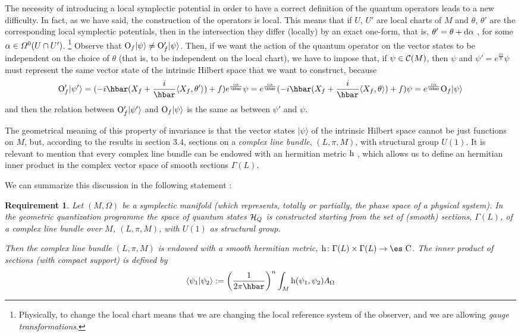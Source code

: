 \documentclass[12pt]{article}
\theoremstyle{plain}
\newtheorem{require}{Requirement}
\def\beq{\begin{equation}}
\def\eeq{\end{equation}}
\def\d{{\rm d}}
\def\C{{\cal C}}
\def\H{{\cal H}}
\def\sta{|\psi \rangle }
\def\Op{{\rm O}}
\def\h{{\rm h}}
\def\Complex{\mbox{\es C}}
\def\LF{{\mit\Lambda}_{\Omega}}
\begin{document}
The necessity of introducing a local symplectic potential
in order to have a correct definition of the
quantum operators leads to a new difficulty.
In fact, as we have said,
the construction of the operators is local.
This means that if
$U$, $U'$ are local charts of $M$
and $\theta$, $\theta '$
are the corresponding local symplectic potentials,
then in the intersection
they differ (locally) by an exact one-form,
that is,
$\theta' = \theta + \d \alpha$ ,
for some
$\alpha \in {\mit\Omega}^0(U \cap U')$.%
\footnote
{Physically, to change the local chart means that we are changing
the local reference system of the observer,
and we are allowing {\it gauge transformations}.
}
Observe that $\Op_f\sta \not= \Op '_f\sta$.
Then, if we want the action of the quantum operator
on the vector states to be independent on the choice of $\theta$
(that is, to be independent on the local chart),
we have to impose that, if $\psi \in \C (M)$, then
$\psi$ and
$\psi '= e^{\frac{i \alpha}{\hbar}}\psi$
must represent the same vector state
of the intrinsic Hilbert space that we want to construct, because
$$
\Op '_f |\psi '\rangle =
(-i\hbar (X_f + \frac{i}{\hbar}\langle X_f,\theta '\rangle )
+ f)e^{\frac{i \alpha}{\hbar}}\psi =
e^{\frac{i \alpha}{\hbar}}
(-i\hbar (X_f + \frac{i}{\hbar}\langle X_f,\theta \rangle ) + f)\psi =
e^{\frac{i \alpha}{\hbar}} \Op_f\sta
$$
and then the relation between
$\Op '_f |\psi '\rangle$ and $\Op_f\sta$
is the same as between $\psi '$ and $\psi$.

The geometrical meaning of this property
of invariance is that the vector states $\sta$
of the intrinsic Hilbert space
cannot be just functions on $M$,
but, according to the results in section 3.4,
sections on a {\it complex line bundle}, $(L,\pi ,M)$,
with structural group $U(1)$.
It is relevant to mention that every complex line bundle
can be endowed with an hermitian metric $\h$ \cite{GHV-72},
which allows us to define an hermitian inner product
in the complex vector space of smooth sections $\Gamma (L)$.

We can summarize this discussion in the following statement
\cite{SW-76}:

\begin{require}
Let $(M,\Omega )$ be a symplectic manifold
(which represents, totally or partially,
the phase space of a physical system).
In the geometric quantization programme
the space of quantum states $\H_Q$ is constructed starting from the set
of
(smooth) sections, $\Gamma (L)$,
of a {\rm complex line bundle} over $M$, $(L,\pi ,M)$,
with $U(1)$ as structural group.

Then the complex line bundle
$(L,\pi ,M)$ is endowed with a smooth hermitian metric,
$\h \colon \Gamma (L) \times \Gamma (L) \to \Complex$.
The {\rm inner product} of sections
(with compact support) is defined by
\beq
\langle \psi_1 |\psi_2\rangle  :=
\biggl(\frac{1}{2\pi \hbar}\biggr)^n
\int_M \h (\psi_1,\psi_2) \LF
\label{inprod1}
\eeq
\label{pclb}
\end{require}
\end{document}
